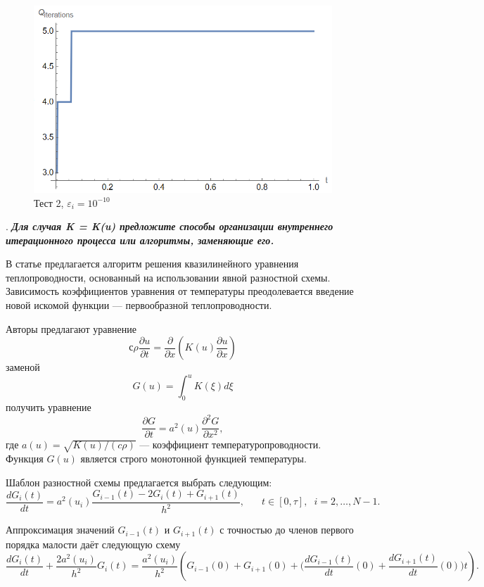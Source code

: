\documentclass[12pt, a4paper]{article}
\newcounter{mycounter}
\newcommand{\quastion}[1]{%
	\stepcounter{mycounter}%
	\textbf{\themycounter}.  %
	\textbf{\textit{#1}}
	
}
\begin{document}
	\begin{figure}[H]
		\centering
		\includegraphics[width=1\textwidth]{test3-1-e-10}
		\caption{Тест 2, $\varepsilon_i=10^{-10}$}
	\end{figure}
	
	
	\clearpage %
	\quastion{Для случая K = K(u) предложите способы организации внутреннего итерационного процесса или алгоритмы, заменяющие его.}
	
	В статье \cite{5} предлагается алгоритм решения квазилинейного уравнения теплопроводности, основанный на использовании явной разностной схемы. Зависимость коэффициентов уравнения от температуры преодолевается введение новой искомой функции --- первообразной теплопроводности.
	
	Авторы предлагают уравнение
	\[
		с \rho\dfrac{\partial u}{\partial t} = \dfrac{\partial}{\partial x}\left(K(u)\dfrac{\partial u}{\partial x} \right)
	\]
	заменой 
	\[
	G(u) = \int_{0}^{u} K(\xi)d\xi
	\]
	получить уравнение
	\[
	\dfrac{\partial G}{\partial t} = a^2(u)\dfrac{\partial^2G}{\partial x^2},
	\]
	где $a(u) = \sqrt{K(u)/(c\rho)}$ --- коэффициент температуропроводности. Функция $G(u)$ является строго монотонной функцией температуры.
	
	Шаблон разностной схемы предлагается выбрать следующим:
	\[
	\dfrac{dG_i(t)}{dt} = a^2(u_i) \dfrac{G_{i-1}(t)-2G_i(t)+G_{i+1}(t)}{h^2}, \phantom{xxx} t\in[0, \tau], \phantom{x} i=2,\ldots,N-1.
	\]
	
	Аппроксимация значений $G_{i-1}(t)$ и $G_{i+1}(t)$ с точностью до членов первого порядка малости даёт следующую схему
	\[
	\dfrac{dG_i(t)}{dt} + \dfrac{2a^2(u_i)}{h^2}G_i(t) = \dfrac{a^2(u_i)}{h^2}\left( G_{i-1}(0) + G_{i+1}(0) + \big(\dfrac{dG_{i-1}(t)}{dt}(0)+\dfrac{dG_{i+1}(t)}{dt}(0)\big)t\right).
	\]
	
\end{document}
